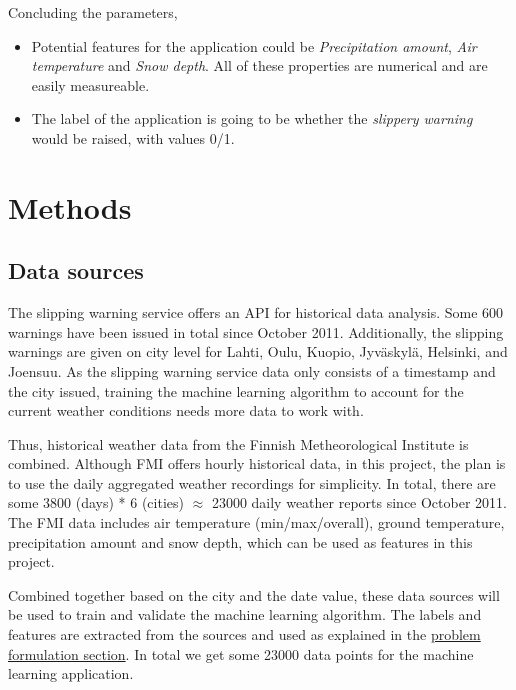 \documentclass[12pt, a4paper]{article}
\begin{document}
    Concluding the parameters, 
    \begin{itemize}
      \item Potential features for the application could be \textit{Precipitation amount}, \textit{Air temperature} and \textit{Snow depth}. All of these properties are numerical and are easily measureable.
      \item The label of the application is going to be whether the \textit{slippery warning} would be raised, with values 0/1.
    \end{itemize}
    
    \section{Methods}

    \subsection{Data sources}
    The slipping warning service offers an API \cite{warnsource} for historical data analysis. Some 600 warnings have been issued in total since October 2011.
    Additionally, the slipping warnings are given on city level for Lahti, Oulu, Kuopio, Jyväskylä, Helsinki, and Joensuu.
    As the slipping warning service data only consists of a timestamp and the city issued, training the machine learning algorithm to account for the current weather conditions needs more data to work with.

    Thus, historical weather data from the Finnish Metheorological Institute \cite{fmisource}
    is combined. Although FMI offers hourly historical data, in this project, the plan is to use the daily aggregated weather recordings for simplicity.
    In total, there are some 3800 (days) * 6 (cities) $\approx$ 23000 daily weather reports since October 2011.
    The FMI data includes air temperature (min/max/overall), ground temperature, precipitation amount and snow depth, which can be used as features in this project.

    Combined together based on the city and the date value, these data sources will be used to train and validate the machine learning algorithm. 
    The labels and features are extracted from the sources and used as explained in the \hyperlink{section.0.2.1}{problem formulation section}. 
    In total we get some 23000 data points for the machine learning application.
\end{document}
